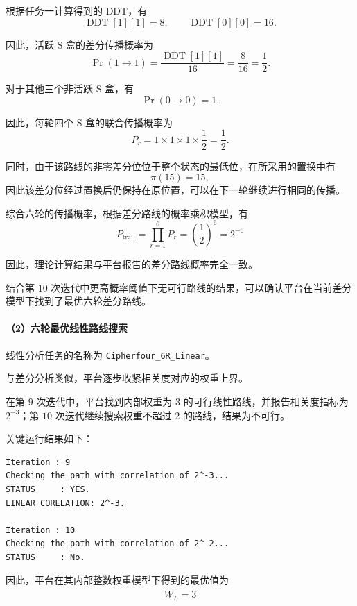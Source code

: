 根据任务一计算得到的 DDT，有
\[
\operatorname{DDT}[1][1]=8,
\qquad
\operatorname{DDT}[0][0]=16.
\]

因此，活跃 S 盒的差分传播概率为
\[
\Pr(1\rightarrow1)
=\frac{\operatorname{DDT}[1][1]}{16}
=\frac{8}{16}
=\frac12.
\]

对于其他三个非活跃 S 盒，有
\[
\Pr(0\rightarrow0)=1.
\]

因此，每轮四个 S 盒的联合传播概率为
\[
P_r=1\times1\times1\times\frac12
=\frac12.
\]

同时，由于该路线的非零差分位位于整个状态的最低位，在所采用的置换中有
\[
\pi(15)=15,
\]
因此该差分位经过置换后仍保持在原位置，可以在下一轮继续进行相同的传播。

综合六轮的传播概率，根据差分路线的概率乘积模型，有
\[
P_{\mathrm{trail}}=\prod_{r=1}^{6}P_r=\left(\frac12\right)^6=2^{-6}
\]

因此，理论计算结果与平台报告的差分路线概率完全一致。

结合第 $10$ 次迭代中更高概率阈值下无可行路线的结果，可以确认平台在当前差分模型下找到了最优六轮差分路线。

\paragraph{（2）六轮最优线性路线搜索}

线性分析任务的名称为
\texttt{Cipherfour\_6R\_Linear}。

与差分分析类似，平台逐步收紧相关度对应的权重上界。

在第 $9$ 次迭代中，平台找到内部权重为 $3$ 的可行线性路线，并报告相关度指标为 $2^{-3}$；第 $10$ 次迭代继续搜索权重不超过 $2$ 的路线，结果为不可行。

关键运行结果如下：
\begin{verbatim}
Iteration : 9
Checking the path with correlation of 2^-3...
STATUS     : YES.
LINEAR CORELATION: 2^-3.

Iteration : 10
Checking the path with correlation of 2^-2...
STATUS     : No.
\end{verbatim}

因此，平台在其内部整数权重模型下得到的最优值为
\[
\widetilde{W}_L=3
\]

